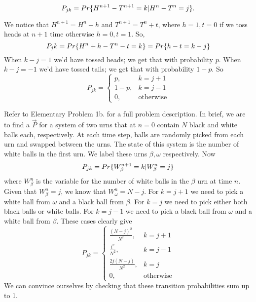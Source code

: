 \begin{equation}
P_{jk} = Pr\{H^{n+1}-T^{n+1}=k|H^n-T^n=j\}.
\end{equation}

We notice that $H^{n+1} = H^n + h$ and $T^{n+1} = T^n + t$, where $h=1, t=0$ if we toss heads
at $n+1$ time otherwise $h=0, t=1$. So,
\begin{equation}
P_jk = Pr\{H^n+h-T^n-t=k\} = Pr\{h-t=k-j\}
\end{equation}
When $k-j=1$ we'd have tossed heads; we get that with probability $p$. When $k-j=-1$ we'd have
tossed tails; we get that with probability $1-p$. So
\begin{equation}
P_{jk} =
    \begin{cases}
    p, & k=j+1 \\
    1-p, & k=j-1 \\
    0, & \text{otherwise}
    \end{cases}
\end{equation}

\par Refer to Elementary Problem 1b. for a full problem description. In brief, we are to find a
$\vec{P}$ for a system of two urns that at $n=0$ contain $N$ black and white balls each, respectively.
At each time step, balls are randomly picked from each urn and swapped between the urns. The state of
this system is the number of white balls in the first urn. We label these urns $\beta,\omega$
respectively. Now
\begin{equation}
P_{jk} = Pr\{W^{n+1}_\beta = k|W^n_\beta = j\}
\end{equation}
where $W^n_\beta$ is the variable for the number of white balls in the $\beta$ urn at time $n$.
Given that $W^n_\beta = j$, we know that $W^n_\omega = N-j$. For $k=j+1$ we need to pick a white
ball from $\omega$ and a black ball from $\beta$. For $k=j$ we need to pick either both black balls
or white balls. For $k=j-1$ we need to pick a black ball from $\omega$ and a white ball from $\beta$.
These cases clearly give
\begin{equation}
P_{jk} =
    \begin{cases}
    \frac{(N-j)^2}{N^2}, & k=j+1 \\
    \frac{i^2}{N^2}, & k=j-1 \\
    \frac{2j(N-j)}{N^2}, & k=j \\
    0, & \text{otherwise}
    \end{cases}
\end{equation}
We can convince ourselves by checking that these transition probabilities sum up to 1.
